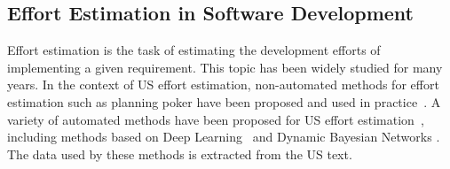 








\subsection{Effort Estimation in Software Development}


Effort estimation is the task of estimating the development efforts of implementing a given requirement. This topic has been widely studied for many years. 
In the context of US effort estimation, non-automated methods for effort estimation such as planning poker have been proposed and used in practice~\cite{mahnivc2012using,haugen2006empirical}.
A variety of automated methods have been proposed for US effort estimation~\cite{ziauddin2012effort}, including methods based on Deep Learning~\cite{choetkiertikul2018deep,porru2016estimating,abrahamsson2011predicting} and 
Dynamic Bayesian Networks \cite{hearty2008predicting}. 
The data used by these methods is extracted from the US text. 

